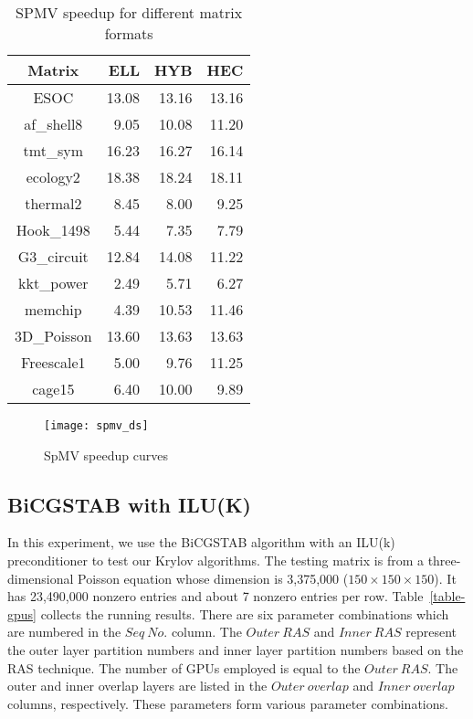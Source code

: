 \documentclass[runningheads,a4paper]{llncs}
\begin{document}
{\begin{table}[!htb]
\centering
\caption{SPMV speedup for different matrix formats}
\begin{tabular}{|c|r|r|r|} \hline
\bfseries Matrix    &\bfseries  ELL &\bfseries  HYB &\bfseries  HEC \\ \hline
ESOC	       &13.08	  &13.16	      &13.16\\ \hline
af\_shell8	   &9.05	  &10.08	      &11.20\\ \hline
tmt\_sym	   &16.23	  &16.27	      &16.14\\ \hline
ecology2	   &18.38	  &18.24	      &18.11\\ \hline
thermal2	   &8.45	  &8.00	          &9.25\\ \hline
Hook\_1498	   &5.44	  &7.35	          &7.79\\ \hline
G3\_circuit	   &12.84	  &14.08	      &11.22\\ \hline
kkt\_power	   &2.49	  &5.71	          &6.27\\ \hline
memchip	       &4.39	  &10.53	      &11.46\\ \hline
3D\_Poisson	   &13.60	  &13.63	      &13.63\\ \hline
Freescale1	   &5.00	  &9.76	          &11.25\\ \hline
cage15	       &6.40	  &10.00	      &9.89\\ \hline
\end{tabular}
\label{tbl_double_single}
\end{table}

\begin{figure}[!tbh]
    \centering
    \texttt{[image: spmv\_ds]}
    \caption{SpMV speedup curves}
    \label{fig_spmv}
\end{figure}

\subsection{BiCGSTAB with ILU(K)}

In this experiment, we use the BiCGSTAB algorithm with an ILU(k) preconditioner to test our Krylov algorithms. The testing matrix is from a three-dimensional Poisson equation whose dimension is 3,375,000 ($150\times150\times150$). It has 23,490,000 nonzero entries and about 7 nonzero entries per row. Table~\ref{table-gpus} collects the running results. There are six parameter combinations which are numbered in the $Seq\ No.$ column. The $Outer\ RAS$ and $Inner\ RAS$ represent the outer layer partition numbers and inner layer partition numbers based on the RAS technique. The number of GPUs employed is equal to the $Outer\ RAS$. The outer and inner overlap layers are listed in the $Outer\ overlap$ and $Inner\ overlap$ columns, respectively. These parameters form various parameter combinations.

}
\end{document}

